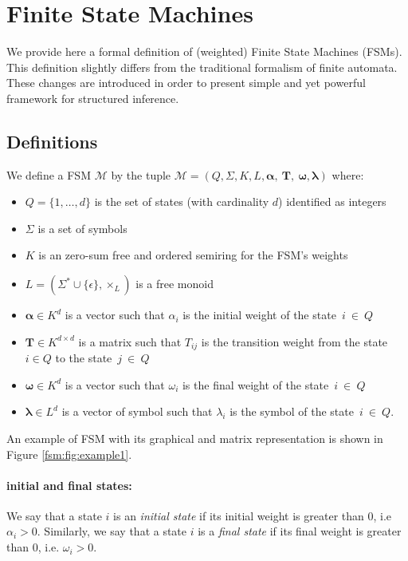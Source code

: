 \section{Finite State Machines}

We provide here a formal definition of (weighted) Finite State Machines
(FSMs). This definition slightly differs from the traditional formalism
of finite automata. These changes are introduced in order to present
simple and yet powerful framework for structured inference.

\subsection{Definitions}

We define a FSM $\mathcal{M}$ by the tuple
$\mathcal{M} = (Q, \Sigma, K, L, \boldsymbol{\alpha},~\mathbf{T},~\boldsymbol{\omega}, \boldsymbol{\lambda})$
where:
\begin{itemize}
    \item $Q = \{1, \dots, d\}$ is the set of states (with cardinality $d$)
        identified as integers
    \item $\Sigma$ is a set of symbols
    \item $K$ is an zero-sum free and ordered semiring for the FSM's weights
    \item $L = (\Sigma^* \cup \{ \epsilon \}, \times_L)$ is a free monoid
    \item $\boldsymbol{\alpha} \in K^d$ is a vector such that $\alpha_i$
    is the initial weight of the state~$i~\in~Q$
    \item $\mathbf{T} \in K^{d\times d}$ is a matrix such that $T_{ij}$
        is the transition weight from the state $i \in Q$ to the state~$j~\in~Q$
    \item $\boldsymbol{\omega} \in K^d$ is a vector such that $\omega_i$
        is the final weight of the state~$i~\in~Q$
    \item $\boldsymbol{\lambda} \in L^d$ is a vector of symbol such that
        $\lambda_i$ is the symbol of the state~$i~\in~Q$.
\end{itemize}
An example of FSM with its graphical and matrix representation is
shown in Figure \ref{fsm:fig:example1}.

\paragraph{initial and final states:} We say that a state $i$ is an
\emph{initial state} if its initial weight is greater than $0$,
i.e $\alpha_i > 0$. Similarly, we say that a state $i$ is a
\emph{final state} if its final weight is greater than $0$, i.e.
$\omega_i > 0$.

